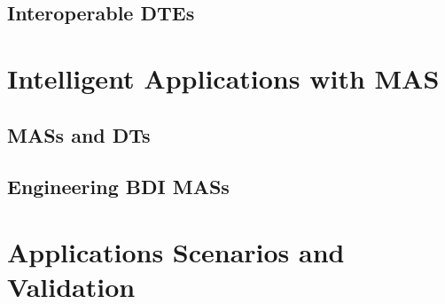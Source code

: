 \documentclass[12pt,a4paper,openright,twoside]{book}
\begin{document}



\chapter{Interoperable \aclp{DTE}}
\label{chap:dte:hwodt}



\part{Intelligent Applications with \acl{MAS}}
\label{part:mas}


\chapter{\aclp{MAS} and \aclp{DT}}
\label{chap:mas:mas-dt}



\chapter{Engineering \acs{BDI} \aclp{MAS}}
\label{chap:mas:engineering}




\part{Applications Scenarios and Validation}
\label{part:validation}
\end{document}
